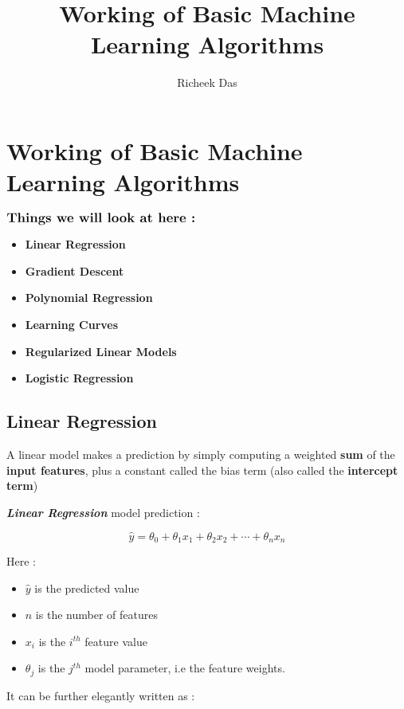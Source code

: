 \documentclass[11pt, a4paper]{book}
\title{Working of Basic Machine Learning Algorithms}
\author{Richeek Das}
\begin{document}
    \setlength{\abovedisplayskip}{3pt}
    \setlength{\belowdisplayskip}{3pt}
    \maketitle
    
\chapter{Working of Basic Machine Learning Algorithms}

    
    \(\large\textbf{Things we will look at here :}\)

\begin{itemize}
\item
  \textbf{Linear Regression}
\item
  \textbf{Gradient Descent}
\item
  \textbf{Polynomial Regression}
\item
  \textbf{Learning Curves}
\item
  \textbf{Regularized Linear Models}
\item
  \textbf{Logistic Regression}
\end{itemize}

    \hypertarget{linear-regression}{%
\section{Linear Regression}\label{linear-regression}}

A linear model makes a prediction by simply computing a weighted
\textbf{sum} of the \textbf{input features}, plus a constant called the
bias term (also called the \textbf{intercept term})

\textbf{\emph{Linear Regression}} model prediction :

\[\hat{y} = \theta_{0} + \theta_{1}x_{1} + \theta_{2}x_{2} + \dotsm + \theta_{n}x_{n}\]

Here :

\begin{itemize}
\item
  \(\hat{y}\) is the predicted value
\item
  \(n\) is the number of features
\item
  \(x_{i}\) is the \(i^{th}\) feature value
\item
  \(\theta_{j}\) is the \(j^{th}\) model parameter, i.e the feature
  weights.
\end{itemize}

It can be further elegantly written as :
\end{document}

